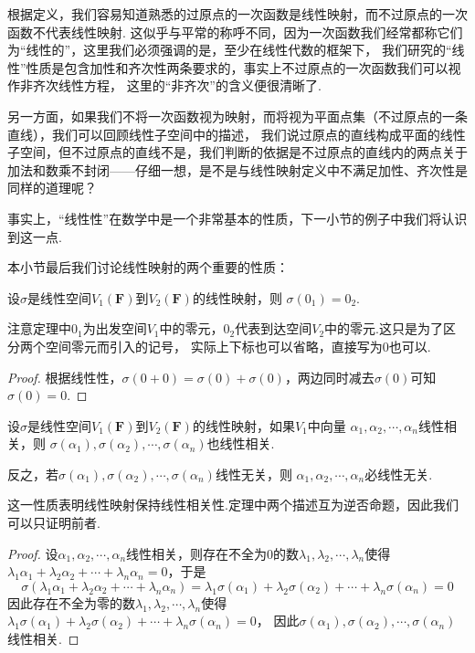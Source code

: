 根据定义，我们容易知道熟悉的过原点的一次函数是线性映射，而不过原点的一次函数不代表线性映射.
这似乎与平常的称呼不同，因为一次函数我们经常都称它们为``线性的''，这里我们必须强调的是，至少在线性代数的框架下，
我们研究的``线性''性质是包含加性和齐次性两条要求的，事实上不过原点的一次函数我们可以视作非齐次线性方程，
这里的``非齐次''的含义便很清晰了.

另一方面，如果我们不将一次函数视为映射，而将视为平面点集（不过原点的一条直线），我们可以回顾线性子空间中的描述，
我们说过原点的直线构成平面的线性子空间，但不过原点的直线不是，我们判断的依据是不过原点的直线内的两点关于
加法和数乘不封闭——仔细一想，是不是与线性映射定义中不满足加性、齐次性是同样的道理呢？

事实上，``线性性''在数学中是一个非常基本的性质，下一小节的例子中我们将认识到这一点.

本小节最后我们讨论线性映射的两个重要的性质：
\begin{theorem}\label{thm:5:线性映射零元性质}
    设$\sigma$是线性空间$V_1(\mathbf{F})$到$V_2(\mathbf{F})$的线性映射，则
    $\sigma(0_1)=0_2$.
\end{theorem}
注意定理中$0_1$为出发空间$V_1$中的零元，$0_2$代表到达空间$V_2$中的零元.这只是为了区分两个空间零元而引入的记号，
实际上下标也可以省略，直接写为0也可以.

\begin{proof}
    根据线性性，$\sigma(0+0)=\sigma(0)+\sigma(0)$，两边同时减去$\sigma(0)$可知$\sigma(0)=0$.
\end{proof}

\begin{theorem}\label{thm:5:线性映射保相关性}
    设$\sigma$是线性空间$V_1(\mathbf{F})$到$V_2(\mathbf{F})$的线性映射，如果$V_1$中向量
    $\alpha_1,\alpha_2,\cdots,\alpha_n$线性相关，则
    $\sigma(\alpha_1),\sigma(\alpha_2),\cdots,\sigma(\alpha_n)$也线性相关.

    反之，若$\sigma(\alpha_1),\sigma(\alpha_2),\cdots,\sigma(\alpha_n)$线性无关，则
    $\alpha_1,\alpha_2,\cdots,\alpha_n$必线性无关.
\end{theorem}
这一性质表明线性映射保持线性相关性.定理中两个描述互为逆否命题，因此我们可以只证明前者.

\begin{proof}
    设$\alpha_1,\alpha_2,\cdots,\alpha_n$线性相关，则存在不全为0的数$\lambda_1,\lambda_2,\cdots,\lambda_n$使得
    $\lambda_1\alpha_1+\lambda_2\alpha_2+\cdots+\lambda_n\alpha_n=0$，于是
    \[\sigma(\lambda_1\alpha_1+\lambda_2\alpha_2+\cdots+\lambda_n\alpha_n)=\lambda_1\sigma(\alpha_1)+\lambda_2\sigma(\alpha_2)+\cdots+\lambda_n\sigma(\alpha_n)=0\]
    因此存在不全为零的数$\lambda_1,\lambda_2,\cdots,\lambda_n$使得$\lambda_1\sigma(\alpha_1)+\lambda_2\sigma(\alpha_2)+\cdots+\lambda_n\sigma(\alpha_n)=0$，
    因此$\sigma(\alpha_1),\sigma(\alpha_2),\cdots,\sigma(\alpha_n)$线性相关.
\end{proof}


